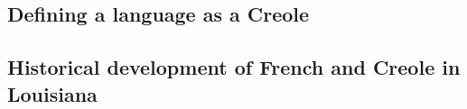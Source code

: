     \subsection{Defining a language as a Creole}
    \subsection{Historical development of French and Creole in Louisiana}
